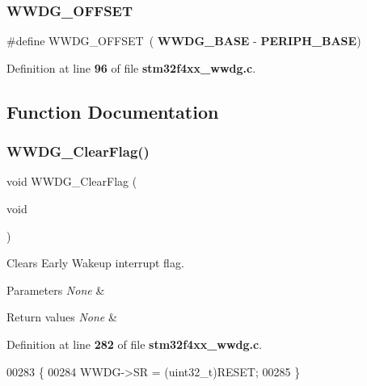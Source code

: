 \subsubsection{W\+W\+D\+G\+\_\+\+O\+F\+F\+S\+ET}
{\footnotesize\ttfamily \#define W\+W\+D\+G\+\_\+\+O\+F\+F\+S\+ET~(\textbf{ W\+W\+D\+G\+\_\+\+B\+A\+SE} -\/ \textbf{ P\+E\+R\+I\+P\+H\+\_\+\+B\+A\+SE})}



Definition at line \textbf{ 96} of file \textbf{ stm32f4xx\+\_\+wwdg.\+c}.



\subsection{Function Documentation}
\mbox{\label{group__WWDG_gabd2b5a6317c2e1a3ab0795838ce59dd2}} 
\subsubsection{W\+W\+D\+G\+\_\+\+Clear\+Flag()}
{\footnotesize\ttfamily void W\+W\+D\+G\+\_\+\+Clear\+Flag (\begin{DoxyParamCaption}\item[{void}]{ }\end{DoxyParamCaption})}



Clears Early Wakeup interrupt flag. 


\begin{DoxyParams}{Parameters}
{\em None} & \\
\hline
\end{DoxyParams}

\begin{DoxyRetVals}{Return values}
{\em None} & \\
\hline
\end{DoxyRetVals}


Definition at line \textbf{ 282} of file \textbf{ stm32f4xx\+\_\+wwdg.\+c}.


\begin{DoxyCode}
00283 \{
00284   WWDG->SR = (uint32\_t)RESET;
00285 \}
\end{DoxyCode}
\mbox{\label{group__WWDG_ga7130f4dc861b9234b62e73f9f57f89a1}} 
